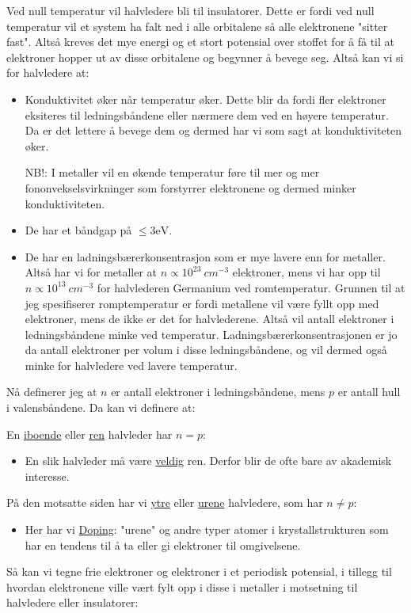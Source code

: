 \documentclass{article}
\begin{document}
\nyside
{}
Ved null temperatur vil halvledere bli til insulatorer. Dette er fordi ved null temperatur vil et system ha falt ned i alle orbitalene så alle elektronene "sitter fast". Altså kreves det mye energi og et stort potensial over stoffet for å få til at elektroner hopper ut av disse orbitalene og begynner å bevege seg. 
Altså kan vi si for halvledere at:
\begin{itemize}
  \item Konduktivitet øker når temperatur øker. Dette blir da fordi fler elektroner eksiteres til ledningsbåndene eller nærmere dem ved en høyere temperatur. Da er det lettere å bevege dem og dermed har vi som sagt at konduktiviteten øker.
  
  NB!: I metaller vil en økende temperatur føre til mer og mer fononvekselsvirkninger som forstyrrer elektronene og dermed minker konduktiviteten.
  \item De har et båndgap på $\le 3 \text{eV}$.
  \item De har en ladningsbærerkonsentrasjon som er mye lavere enn for metaller. Altså har vi for metaller at $n \propto 10^{23} \ cm^{-3}$ elektroner, mens vi har opp til $n \propto 10^{13} \ cm^{-3}$ for halvlederen Germanium ved romtemperatur. Grunnen til at jeg spesifiserer romptemperatur er fordi metallene vil være fyllt opp med elektroner, mens de ikke er det for halvlederene. Altså vil antall elektroner i ledningsbåndene minke ved temperatur. Ladningsbærerkonsentrasjonen er jo da antall elektroner per volum i disse ledningsbåndene, og vil dermed også minke for halvledere ved lavere temperatur.
\end{itemize}
Nå definerer jeg at $n$ er antall elektroner i ledningsbåndene, mens $p$ er antall hull i valensbåndene. Da kan vi definere at:

En \underline{iboende} eller \underline{ren} halvleder har $n = p$:
\begin{itemize}
  \item En slik halvleder må være \underline{veldig} ren. Derfor blir de ofte bare av akademisk interesse.
\end{itemize}
På den motsatte siden har vi \underline{ytre} eller \underline{urene} halvledere, som har $n \ne p$:
\begin{itemize}
  \item Her har vi \underline{Doping}: "urene" og andre typer atomer i krystallstrukturen som har en tendens til å ta eller gi elektroner til omgivelsene.
\end{itemize}
Så kan vi tegne frie elektroner og elektroner i et periodisk potensial, i tillegg til hvordan elektronene ville vært fylt opp i disse i metaller i motsetning til halvledere eller insulatorer:
\end{document}
